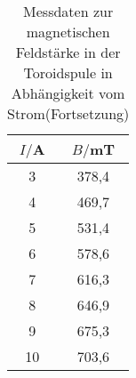 \begin{table}
  \centering
  \caption{Messdaten zur magnetischen Feldstärke in der Toroidspule in Abhängigkeit
  vom Strom(Fortsetzung)}
  \label{tab:hysterese_f}
  \begin{tabular}{c c}
    \toprule
    $I/$A & $B/$mT\\
    \midrule
    3	  &  378,4\\
    4	  &  469,7\\
    5	  &  531,4\\
    6	  &  578,6\\
    7	  &  616,3\\
    8	  &  646,9\\
    9	  &  675,3\\
    10	&  703,6\\
    \bottomrule
  \end{tabular}
\end{table}
